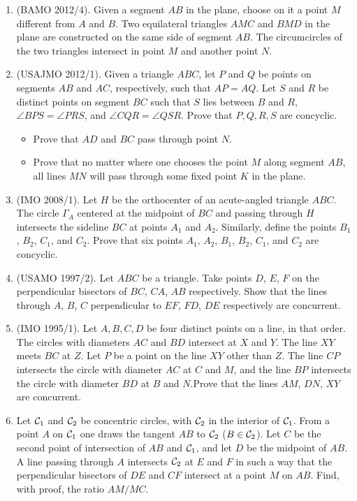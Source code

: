 \documentclass[11pt]{scrartcl}
\begin{document}
\begin{enumerate}
    \item (BAMO 2012/4). Given a segment $AB$ in the plane, choose on it a point $M$ different from $A$ and $B$. Two equilateral triangles $AMC$ and $BMD$ in the plane are constructed on the same side of segment $AB$. The circumcircles of the two triangles intersect in point $M$ and another point $N$.
    
    \item (USAJMO 2012/1). Given a triangle $ABC$, let $P$ and $Q$ be points on segments $AB$ and $AC$, respectively, such that $AP = AQ$. Let $S$ and $R$ be distinct points on segment $BC$ such that $S$ lies between $B$ and $R$, $\angle BPS = \angle PRS$, and $\angle CQR = \angle QSR$. Prove that $P, Q, R, S$ are concyclic.
    \begin{itemize}[(a)]
            \item  Prove that $AD$ and $BC$ pass through point $N$.
            \item  Prove that no matter where one chooses the point $M$ along segment $AB$, all lines $MN$ will pass through some fixed point $K$ in the plane.
    \end{itemize}
    
    \item (IMO 2008/1). Let $H$ be the orthocenter of an acute-angled triangle $ABC$. The circle $\Gamma_A$ centered at the midpoint of $BC$ and passing through $H$ intersects the sideline $BC$ at points $A_1$ and $A_2$. Similarly, define the points $B_1$, $B_2$, $C_1$, and $C_2$. Prove that six points $A_1$, $A_2$, $B_1$, $B_2$, $C_1$, and $C_2$ are concyclic.
    
    \item (USAMO 1997/2). Let $ABC$ be a triangle. Take points $D$, $E$, $F$ on the perpendicular bisectors of $BC$, $CA$, $AB$ respectively. Show that the lines through $A$, $B$, $C$ perpendicular to $EF$, $FD$, $DE$ respectively are concurrent.
    
    \item (IMO 1995/1). Let $A, B, C, D$ be four distinct points on a line, in that order. The circles with diameters $AC$ and $BD$ intersect at $X$ and $Y$. The line $XY$ meets $BC$ at $Z$. Let $P$ be a point on the line $XY$ other than $Z$. The line $CP$ intersects the circle with diameter $AC$ at $C$ and $M$, and the line $BP$ intersects the circle with diameter $BD$ at $B$ and $N$.Prove that the lines $AM$, $DN$, $XY$ are concurrent.
    
    \item Let ${\cal C}_1$ and ${\cal C}_2$ be concentric circles, with ${\cal C}_2$ in the interior of ${\cal C}_1$. From a point $A$ on ${\cal C}_1$ one draws the tangent $AB$ to ${\cal C}_2$ ($B\in {\cal C}_2$). Let $C$ be the second point of intersection of $AB$ and ${\cal C}_1$, and let $D$ be the midpoint of $AB$. A line passing through $A$ intersects ${\cal C}_2$ at $E$ and $F$ in such a way that the perpendicular bisectors of $DE$ and $CF$ intersect at a point $M$ on $AB$. Find, with proof, the ratio $AM/MC$.
    

\end{enumerate}
\end{document}
